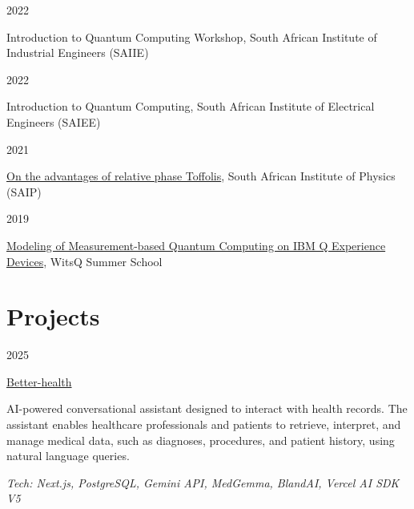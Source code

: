 \documentclass[9pt]{extreport}
\newcommand{\listitemspace}{0.25em}
\renewenvironment{itemize}
{\begin{list}{}{
    \setlength{\leftmargin}{0em}
    \setlength{\parskip}{0em}
    \setlength{\itemsep}{\listitemspace}
    \setlength{\parsep}{\listitemspace}}}
{\end{list}}
\newcommand{\entry}[2]{%
  \noindent%
  \begin{minipage}[t]{2.25cm}%
    \raggedright #1%
  \end{minipage}%
  \hspace{0.4cm}%
  \begin{minipage}[t]{\dimexpr\textwidth-2cm\relax}%
    #2%
  \end{minipage}%
  \vspace{0.25cm}%
}
\begin{document}
\entry{2022}{{Introduction to Quantum Computing Workshop}, South African Institute of Industrial Engineers (SAIIE)}

\entry{2022}{{Introduction to Quantum Computing}, South African Institute of Electrical Engineers (SAIEE)}

\entry{2021}{\href{https://github.com/Unathi-Skosana/posters-n-presentations/blob/main/posters/saip-2021/release/poster.pdf}{{On the advantages of relative phase Toffolis}}, South African Institute of Physics (SAIP)}

\entry{2019}{\href{https://github.com/Unathi-Skosana/posters-n-presentations/blob/main/posters/witsq-summer-school-2019/release/poster.pdf}{Modeling of Measurement-based Quantum Computing on IBM Q Experience Devices}, WitsQ Summer School}






\section*{Projects}

\entry{2025}{\href{https://github.com/Unathi-Skosana/team-better-health}{Better-health}
\begin{itemize}
  \item AI-powered conversational assistant designed to interact with health records. The assistant enables healthcare professionals and patients to retrieve, interpret, and manage medical data, such as diagnoses, procedures, and patient history, using natural language queries. 
  \item \textit{Tech: Next.js, PostgreSQL, Gemini API, MedGemma, BlandAI, Vercel AI SDK V5}
\end{itemize}}
\end{document}
